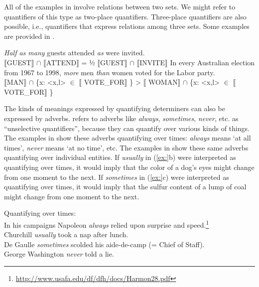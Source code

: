 All of the examples in  involve relations between two sets. We might refer to quantifiers of this type as two-place quantifiers. Three-place quantifiers are also possible, i.e., quantifiers that express relations among three sets. Some examples are provided in .


\ea
\ea  \textit{Half as many} guests attended \textit{as} were invited.\\
\textsc{{\textbar}} \textsc{$\llbracket$}GUEST$\rrbracket$  ${\cap}$ \textsc{$\llbracket$}ATTEND$\rrbracket$  {\textbar}  =  ½\textsc{{\textbar}} \textsc{$\llbracket$}GUEST$\rrbracket$  ${\cap}$ \textsc{$\llbracket$}INVITE$\rrbracket$  {\textbar}
\ex In every Australian election from 1967 to 1998, \textit{more} men \textit{than} women voted for the Labor party.\\
{\textbar} \textsc{$\llbracket$}MAN$\rrbracket$  ${\cap}$ \{x: <x,l> ${\in}$ $\llbracket$ VOTE\_FOR$\rrbracket$ \}{\textbar}  >  {\textbar} \textsc{$\llbracket$ WO}MAN$\rrbracket$  ${\cap}$ \{x: <x,l> ${\in}$ $\llbracket$ VOTE\_FOR$\rrbracket$ \}{\textbar}
\z \z


The kinds of meanings expressed by quantifying determiners can also be expressed by adverbs. \citet{Lewis1975} refers to adverbs like \textit{always}, \textit{sometimes}, \textit{never}, etc. as “unselective quantifiers”, because they can quantify over various kinds of things. The examples in  show these adverbs quantifying over times: \textit{always} means ‘at all times’, \textit{never} means ‘at no time’, etc. The examples in  show these same adverbs quantifying over individual entities. If \textit{usually} in (\ref{ex:}b) were interpreted as quantifying over times, it would imply that the color of a dog’s eyes might change from one moment to the next. If \textit{sometimes} in (\ref{ex:}c) were interpreted as quantifying over times, it would imply that the sulfur content of a lump of coal might change from one moment to the next.


\ea
Quantifying over times:\\
\ea In his campaigns Napoleon \textit{always} relied upon surprise and speed.\footnote{\url{http://www.usafa.edu/df/dfh/docs/Harmon28.pdf}} \\
\ex Churchill \textit{usually} took a nap after lunch.\\
\ex De Gaulle \textit{sometimes} scolded his aide-de-camp (= Chief of Staff).\\
\ex George Washington \textit{never} told a lie.
                       \z
\z

